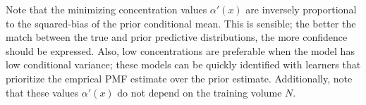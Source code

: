 \documentclass[12pt]{report}
\DeclareMathOperator{\xrm}{\mathrm{x}}
\DeclareMathOperator{\yrm}{\mathrm{y}}
\DeclareMathOperator{\nrm}{\mathrm{n}}
\DeclareMathOperator{\Erm}{\mathrm{E}}
\begin{document}
Note that the minimizing concentration values $\alpha'(x)$ are inversely proportional to the squared-bias of the prior conditional mean. This is sensible; the better the match between the true and prior predictive distributions, the more confidence should be expressed. Also, low concentrations are preferable when the model has low conditional variance; these models can be quickly identified with learners that prioritize the emprical PMF estimate over the prior estimate. Additionally, note that these values $\alpha'(x)$ do not depend on the training volume $N$.



\end{document}

